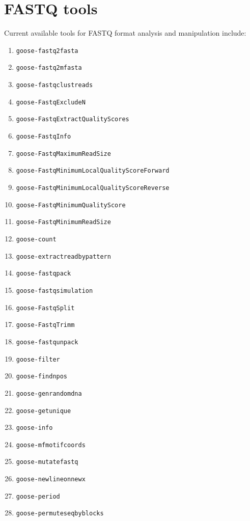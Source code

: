 \chapter{FASTQ tools}
\label{fastq}

Current available tools for FASTQ format analysis and manipulation include:
\begin{enumerate}

\item \texttt{goose-fastq2fasta}
\item \texttt{goose-fastq2mfasta}
\item \texttt{goose-fastqclustreads}
\item \texttt{goose-FastqExcludeN}
\item \texttt{goose-FastqExtractQualityScores}
\item \texttt{goose-FastqInfo}
\item \texttt{goose-FastqMaximumReadSize}
\item \texttt{goose-FastqMinimumLocalQualityScoreForward}
\item \texttt{goose-FastqMinimumLocalQualityScoreReverse}
\item \texttt{goose-FastqMinimumQualityScore}
\item \texttt{goose-FastqMinimumReadSize}

\item \texttt{goose-count}
\item \texttt{goose-extractreadbypattern}



\item \texttt{goose-fastqpack}
\item \texttt{goose-fastqsimulation}
\item \texttt{goose-FastqSplit}
\item \texttt{goose-FastqTrimm}
\item \texttt{goose-fastqunpack}
\item \texttt{goose-filter}
\item \texttt{goose-findnpos}

\item \texttt{goose-genrandomdna}
\item \texttt{goose-getunique}
\item \texttt{goose-info}
\item \texttt{goose-mfmotifcoords}



\item \texttt{goose-mutatefastq}
\item \texttt{goose-newlineonnewx}
\item \texttt{goose-period}
\item \texttt{goose-permuteseqbyblocks}



\end{enumerate}

